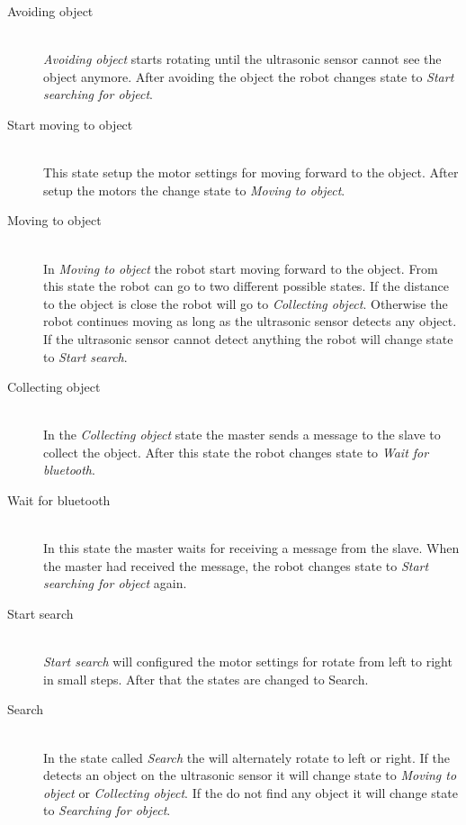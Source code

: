 \begin{description}
\item[Avoiding object] \hfill \\
\emph{Avoiding object} starts rotating until the ultrasonic sensor cannot see the object anymore. After avoiding the object the robot changes state to \emph{Start searching for object}.

\item[Start moving to object] \hfill \\
This state setup the motor settings for moving forward to the object. After setup the motors the \projname{} change state to \emph{Moving to object}.

\item[Moving to object] \hfill \\
In \emph{Moving to object} the robot start moving forward to the object. From this state the robot can go to two different possible states. If the distance to the object is close the robot will go to \emph{Collecting object}. Otherwise the robot continues moving as long as the ultrasonic sensor detects any object. If the ultrasonic sensor  cannot detect anything the robot will change state to \emph{Start search}.

\item[Collecting object] \hfill \\
In the \emph{Collecting object} state the master sends a message to the slave to collect the object. After this state the robot changes state to \emph{Wait for bluetooth}.

\item[Wait for bluetooth] \hfill \\
In this state the master waits for receiving a message from the slave. When the master had received the message, the robot changes state to \emph{Start searching for object} again. 

\item[Start search] \hfill \\
\emph{Start search} will configured the motor settings for rotate from left to right in small steps. After that the states are changed to Search.

\item[Search] \hfill \\
In the state called \emph{Search} the \projname{} will alternately rotate to left or right. If the \projname{} detects an object on the ultrasonic sensor it will change state to \emph{Moving to object} or \emph{Collecting object}. If the \projname{} do not find any object it will change state to \emph{Searching for object}. 

\end{description}